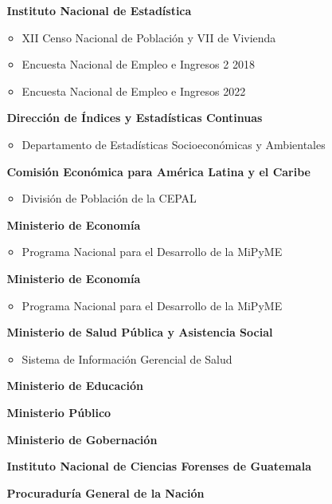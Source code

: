 \newpage
	\begin{itemize}
		\item[$ $] \textbf{Instituto Nacional de Estadística}
		\begin{itemize}
			\item	XII Censo Nacional de Población y VII de Vivienda 
			\item	Encuesta Nacional de Empleo e Ingresos 2 2018
			\item	Encuesta Nacional de Empleo e Ingresos 2022
		\end{itemize}
		\item[$ $] \textbf{Dirección de Índices y Estadísticas Continuas}
		\begin{itemize}
			\item	Departamento de Estadísticas Socioeconómicas y Ambientales
		\end{itemize}
		\item[$ $] \textbf{Comisión Económica para América Latina y el Caribe}
		\begin{itemize}
			\item	División de Población de la CEPAL
		\end{itemize}
		\item[$ $] \textbf{Ministerio de Economía}
		\begin{itemize}
			\item	Programa Nacional para el Desarrollo de la MiPyME
		\end{itemize}
		\item[$ $] \textbf{Ministerio de Economía}
		\begin{itemize}
			\item	Programa Nacional para el Desarrollo de la MiPyME
		\end{itemize}	
		\item[$ $] \textbf{Ministerio de Salud Pública y Asistencia Social}
		\begin{itemize}
			\item	Sistema de Información Gerencial de Salud		
		\end{itemize}
		\item[$ $] \textbf{Ministerio de Educación}
		\item[$ $] \textbf{Ministerio Público}
		\item[$ $] \textbf{Ministerio de Gobernación}
		\item[$ $] \textbf{Instituto Nacional de Ciencias Forenses de Guatemala}	
		\item[$ $] \textbf{Procuraduría General de la Nación}
		\begin{itemize}

\end{itemize}
\end{itemize}
